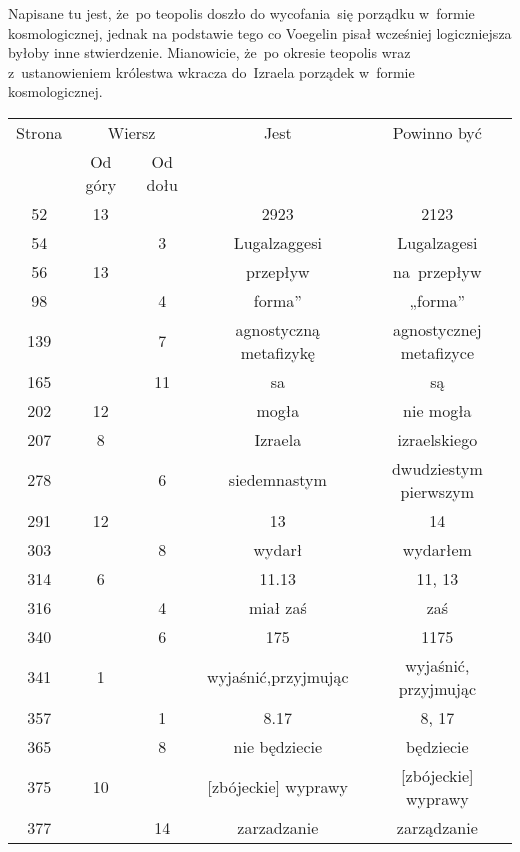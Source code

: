 \documentclass[a4paper,11pt]{article}
\numberwithin{equation}{section}
\begin{document}
\VerSpaceFour





\noindent
{} Napisane tu jest, że~po teopolis doszło do
wycofania~się porządku w~formie kosmologicznej, jednak na podstawie
tego co Voegelin pisał wcześniej logiczniejsza byłoby inne
stwierdzenie. Mianowicie, że~po okresie teopolis wraz z~ustanowieniem
królestwa wkracza do~Izraela porządek w~formie kosmologicznej.





\newpage



\begin{center}

  \begin{tabular}{|c|c|c|c|c|}
    \hline
    Strona & \multicolumn{2}{c|}{Wiersz} & Jest
                              & Powinno być \\ \cline{2-3}
    & Od góry & Od dołu & & \\
    \hline
    52  & 13 & & 2923 & 2123 \\
    54  & &  3 & Lugalzaggesi & Lugalzagesi \\
    56  & 13 & & przepływ & na~przepływ \\
    98  & &  4 & forma” & „forma” \\
    139 & &  7 & agnostyczną metafizykę & agnostycznej metafizyce \\
    165 & & 11 & sa & są \\
    202 & 12 & & mogła & nie mogła \\
    207 &  8 & & Izraela & izraelskiego \\
    278 & &  6 & siedemnastym & dwudziestym pierwszym \\
    291 & 12 & & 13 & 14 \\
    303 & &  8 & wydarł & wydarłem \\
    314 &  6 & & 11.13 & 11, 13 \\
    316 & &  4 & miał zaś & zaś \\
    340 & &  6 & 175 & 1175 \\
    341 &  1 & & wyjaśnić,przyjmując & wyjaśnić, przyjmując \\
    357 & &  1 & 8.17 & 8, 17 \\
    365 & &  8 & nie będziecie & będziecie \\
    375 & 10 & & [zbójeckie]{ } wyprawy & [zbójeckie] wyprawy \\
    377 & & 14 & zarzadzanie & zarządzanie \\
    \hline
  \end{tabular}

\end{center}
\end{document}
